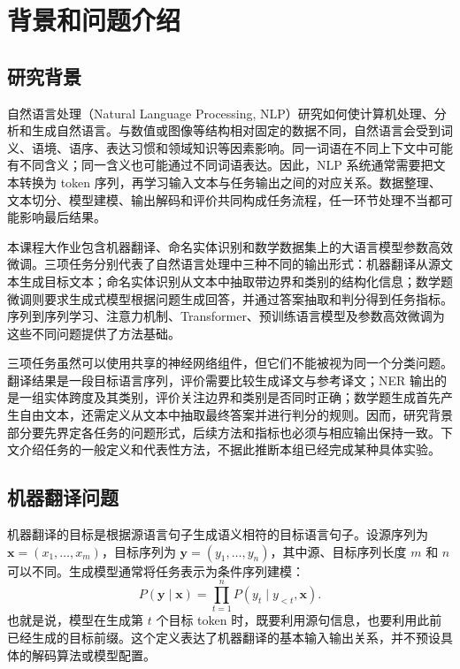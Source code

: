 \documentclass[UTF8,a4paper,12pt,fontset=none]{ctexart}
\begin{document}
\tableofcontents
\newpage
{}

\section{背景和问题介绍}

\subsection{研究背景}
自然语言处理（Natural Language Processing, NLP）研究如何使计算机处理、分析和生成自然语言。与数值或图像等结构相对固定的数据不同，自然语言会受到词义、语境、语序、表达习惯和领域知识等因素影响。同一词语在不同上下文中可能有不同含义；同一含义也可能通过不同词语表达。因此，NLP 系统通常需要把文本转换为 token 序列，再学习输入文本与任务输出之间的对应关系。数据整理、文本切分、模型建模、输出解码和评价共同构成任务流程，任一环节处理不当都可能影响最后结果。

本课程大作业包含机器翻译、命名实体识别和数学数据集上的大语言模型参数高效微调。三项任务分别代表了自然语言处理中三种不同的输出形式：机器翻译从源文本生成目标文本；命名实体识别从文本中抽取带边界和类别的结构化信息；数学题微调则要求生成式模型根据问题生成回答，并通过答案抽取和判分得到任务指标。序列到序列学习、注意力机制、Transformer、预训练语言模型及参数高效微调为这些不同问题提供了方法基础\cite{seq2seq,bahdanau,transformer,bert,lora}。

三项任务虽然可以使用共享的神经网络组件，但它们不能被视为同一个分类问题。翻译结果是一段目标语言序列，评价需要比较生成译文与参考译文；NER 输出的是一组实体跨度及其类别，评价关注边界和类别是否同时正确；数学题生成首先产生自由文本，还需定义从文本中抽取最终答案并进行判分的规则。因而，研究背景部分要先界定各任务的问题形式，后续方法和指标也必须与相应输出保持一致。下文介绍任务的一般定义和代表性方法，不据此推断本组已经完成某种具体实验。

\subsection{机器翻译问题}
机器翻译的目标是根据源语言句子生成语义相符的目标语言句子。设源序列为 $\mathbf{x}=(x_1,\ldots,x_m)$，目标序列为 $\mathbf{y}=(y_1,\ldots,y_n)$，其中源、目标序列长度 $m$ 和 $n$ 可以不同。生成模型通常将任务表示为条件序列建模：
\[
  P(\mathbf{y}\mid\mathbf{x})=\prod_{t=1}^{n}P(y_t\mid y_{<t},\mathbf{x}).
\]
也就是说，模型在生成第 $t$ 个目标 token 时，既要利用源句信息，也要利用此前已经生成的目标前缀。这个定义表达了机器翻译的基本输入输出关系，并不预设具体的解码算法或模型配置。
\end{document}
